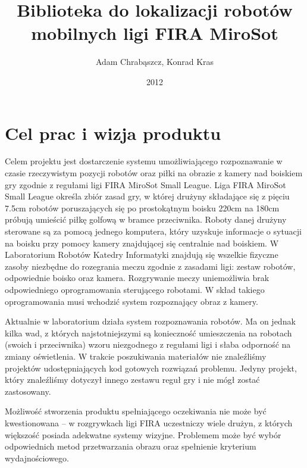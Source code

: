 \documentclass[polish,12pt]{aghthesis}
\author{Adam Chrabąszcz, Konrad Kras}
\title{Biblioteka do lokalizacji robotów mobilnych ligi FIRA MiroSot}
\date{2012}
\begin{document}
\maketitle



\section{Cel prac i wizja produktu}
\label{sec:cel-wizja}
Celem projektu jest
dostarczenie systemu umożliwiającego rozpoznawanie w czasie rzeczywistym
pozycji robotów oraz piłki na obrazie z kamery nad boiskiem gry zgodnie z
regułami ligi FIRA MiroSot Small League.
Liga FIRA MiroSot Small League określa zbiór zasad gry, w której drużyny
składające się z pięciu 7.5cm robotów poruszających się po prostokątnym boisku
220cm na 180cm próbują umieścić piłkę golfową w bramce przeciwnika. Roboty danej
drużyny sterowane są za pomocą jednego komputera, który uzyskuje informacje
o sytuacji na boisku przy pomocy kamery znajdującej się centralnie nad boiskiem.
W Laboratorium Robotów Katedry Informatyki znajdują się wszelkie fizyczne zasoby
niezbędne do rozegrania meczu zgodnie z zasadami ligi: zestaw robotów, 
odpowiednie boisko oraz kamera. Rozgrywanie meczy uniemożliwia brak 
odpowiedniego oprogramowania sterującego robotami. W skład takiego 
oprogramowania musi wchodzić system rozpoznający obraz z kamery. 

Aktualnie w laboratorium działa system rozpoznawania robotów. Ma on jednak kilka
wad, z których najstotniejszymi są konieczność umieszczenia na robotach
(swoich i przeciwnika) wzoru niezgodnego z regułami ligi
i słaba odporność na zmiany oświetlenia.
W trakcie poszukiwania materiałów nie znaleźliśmy projektów udostępniających
kod gotowych rozwiązań problemu. Jedyny projekt, który znaleźliśmy dotyczył
innego zestawu reguł gry i nie mógł zostać zastosowany. 

Możliwość stworzenia produktu spełniającego oczekiwania nie może być
kwestionowana -- w rozgrywkach ligi FIRA uczestniczy wiele drużyn, z których
większość posiada adekwatne systemy wizyjne. Problemem może być wybór
odpowiednich metod przetwarzania obrazu oraz spełnienie kryterium
wydajnościowego.
\end{document}
